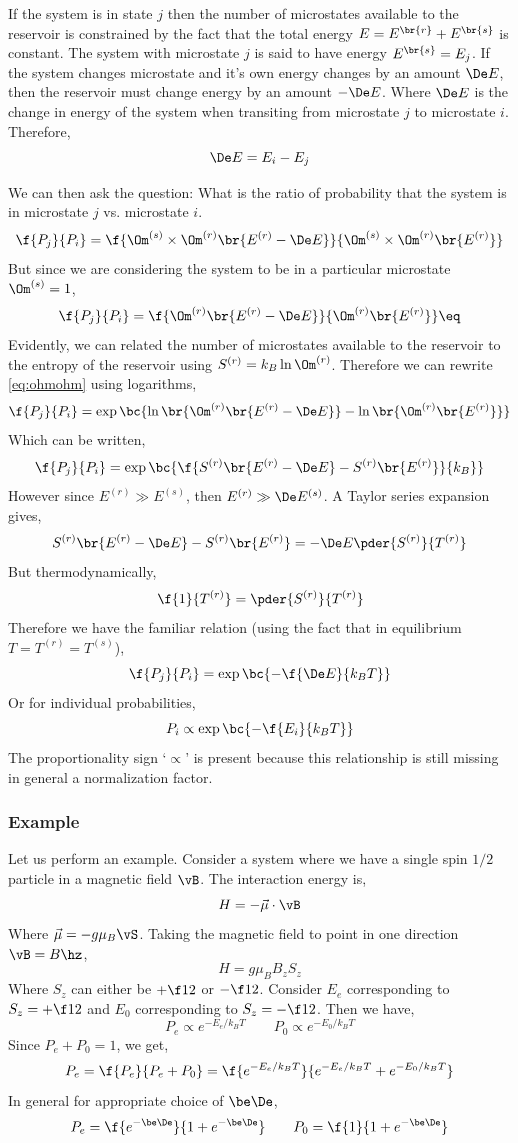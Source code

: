 \documentclass{article}
\begin{document}
If the system is in state $j$ then the number of microstates available to the reservoir is constrained by the fact that the total energy $E = E^{\br{r}} + E^{\br{s}}$ is constant. The system with microstate $j$ is said to have energy $E^{\br{s}} = E_j$. If the system changes microstate and it's own energy changes by an amount $\De E$, then the reservoir must change energy by an amount $-\De E$. Where $\De E$ is the change in energy of the system when transiting from microstate $j$ to microstate $i$. Therefore,
\[ \De E = E_i - E_j \]

We can then ask the question: What is the ratio of probability that the system is in microstate $j$ vs. microstate $i$.
\[ \f{P_j}{P_i} = \f{\Om^{(s)} \times \Om^{(r)}\br{E^{(r)} - \De E}}{\Om^{(s)} \times \Om^{(r)}\br{E^{(r)}}} \]
But since we are considering the system to be in a particular microstate $\Om^{(s)} = 1$,
\[ \f{P_j}{P_i} = \f{\Om^{(r)}\br{E^{(r)} - \De E}}{\Om^{(r)}\br{E^{(r)}}} \eq \label{eq:ohmohm}\]
Evidently, we can related the number of microstates available to the reservoir to the entropy of the reservoir using $S^{(r)} = k_B \ln \Om^{(r)}$. Therefore we can rewrite \eqref{eq:ohmohm} using logarithms,
\[ \f{P_j}{P_i} = \exp\bc{\ln \br{\Om^{(r)}\br{E^{(r)} - \De E}} - \ln \br{\Om^{(r)}\br{E^{(r)}}}} \]
Which can be written,
\[ \f{P_j}{P_i} = \exp\bc{\f{S^{(r)}\br{E^{(r)} - \De E} - S^{(r)}\br{E^{(r)}}}{k_B}} \]
However since $E^{(r)} \gg E^{(s)}$, then $E^{(r)} \gg \De E^{(s)}$. A Taylor series expansion gives,
\[ S^{(r)}\br{E^{(r)} - \De E} - S^{(r)}\br{E^{(r)}} = - \De E \pder{S^{(r)}}{T^{(r)}} \]
But thermodynamically,
\[ \f{1}{T^{(r)}} = \pder{S^{(r)}}{T^{(r)}}\]
Therefore we have the familiar relation (using the fact that in equilibrium $T = T^{(r)} = T^{(s)}$),
\[ \f{P_j}{P_i} = \exp\bc{-\f{\De E}{k_B T}} \]
Or for individual probabilities,
\[ P_i \propto \exp\bc{-\f{E_i}{k_B T}} \]
The proportionality sign `$\propto$' is present because this relationship is still missing in general a normalization factor.
\subsubsection{Example}
Let us perform an example. Consider a system where we have a single spin $1/2$ particle in a magnetic field $\vB$. The interaction energy is,
\[ H = - \vec{\mu} \cdot \vB \]
Where $\vec{\mu}= - g \mu_B \vS$. Taking the magnetic field to point in one direction $\vB = B \hz$,
\[ H = g \mu_B B_z S_z \]
Where $S_z$ can either be $+ \f12$ or $-\f12$. Consider $E_e$ corresponding to $S_z = +\f12$ and $E_0$ corresponding to $S_z = - \f12$. Then we have,
\[ P_e \propto e^{-E_e / k_B T} \qquad P_0 \propto e^{-E_0 / k_B T} \]
Since $P_e + P_0 = 1$, we get,
\[ P_e = \f{P_e}{P_e + P_0} = \f{e^{-E_e / k_B T}}{e^{-E_e / k_B T} + e^{-E_0 / k_B T}} \]
In general for appropriate choice of $\be \De$,
\[ P_e = \f{e^{-\be \De}}{1 + e^{-\be \De}} \qquad P_0 = \f{1}{1 + e^{-\be \De}} \]
\end{document}
